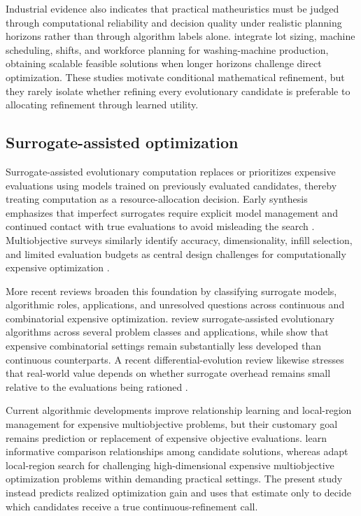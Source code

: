 \documentclass[]{interact}
\begin{document}
Industrial evidence also indicates that practical matheuristics must be judged through computational reliability and decision quality under realistic planning horizons rather than through algorithm labels alone. \citet{Seyfi2026} integrate lot sizing, machine scheduling, shifts, and workforce planning for washing-machine production, obtaining scalable feasible solutions when longer horizons challenge direct optimization. These studies motivate conditional mathematical refinement, but they rarely isolate whether refining every evolutionary candidate is preferable to allocating refinement through learned utility.

\subsection{Surrogate-assisted optimization}

Surrogate-assisted evolutionary computation replaces or prioritizes expensive evaluations using models trained on previously evaluated candidates, thereby treating computation as a resource-allocation decision. Early synthesis emphasizes that imperfect surrogates require explicit model management and continued contact with true evaluations to avoid misleading the search \citep{Jin2011}. Multiobjective surveys similarly identify accuracy, dimensionality, infill selection, and limited evaluation budgets as central design challenges for computationally expensive optimization \citep{Chugh2019}.

More recent reviews broaden this foundation by classifying surrogate models, algorithmic roles, applications, and unresolved questions across continuous and combinatorial expensive optimization. \citet{He2023} review surrogate-assisted evolutionary algorithms across several problem classes and applications, while \citet{Liu2024} show that expensive combinatorial settings remain substantially less developed than continuous counterparts. A recent differential-evolution review likewise stresses that real-world value depends on whether surrogate overhead remains small relative to the evaluations being rationed \citep{Yu2025}.

Current algorithmic developments improve relationship learning and local-region management for expensive multiobjective problems, but their customary goal remains prediction or replacement of expensive objective evaluations. \citet{Pierce2025} learn informative comparison relationships among candidate solutions, whereas \citet{Wang2026} adapt local-region search for challenging high-dimensional expensive multiobjective optimization problems within demanding practical settings. The present study instead predicts realized optimization gain and uses that estimate only to decide which candidates receive a true continuous-refinement call.
\end{document}
